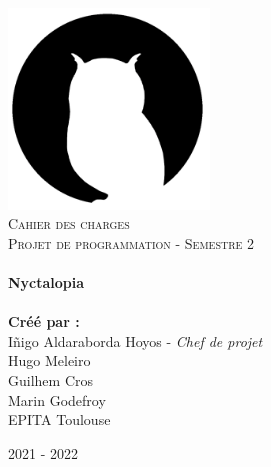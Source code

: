 \begin{titlepage}
    \vbox{ }

    \vbox{ }

    \begin{center}
        \includegraphics[width=0.40\textwidth]{img/logo.png}\\[1cm]
        \textsc{\Large Cahier des charges}\\[0.2cm]
        \textsc{\Large Projet de programmation - Semestre 2}\\[0.6cm]

        \noindent\makebox[\linewidth]{\rule{.7\paperwidth}{.6pt}}\\[0.7cm]
        { \huge \bfseries Nyctalopia}\\[0.25cm]
        \noindent\makebox[\linewidth]{\rule{.7\paperwidth}{.6pt}}\\[0.7cm]
        \large{\bfseries Créé par :}\\[0.1cm]
        \large{Iñigo Aldaraborda Hoyos - \emph{Chef de projet}}\\[0.1cm]
        \large{Hugo Meleiro}\\[0.1cm]
        \large{Guilhem Cros}\\[0.1cm]
        \large{Marin Godefroy}\\[0.1cm]
        \vfill
        \large
        EPITA Toulouse

            {\large 2021 - 2022}
    \end{center}
\end{titlepage}
